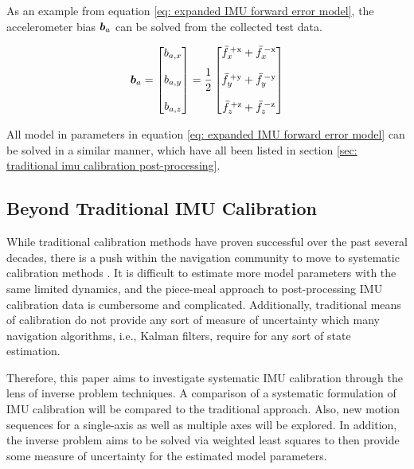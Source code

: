 As an example from equation \ref{eq: expanded IMU forward error model}, the accelerometer bias $\boldsymbol{b}_a$ can be solved from the collected test data.

\begin{align} 
	\boldsymbol{b}_a = \begin{bmatrix} b_{a,x} \\ \\ b_{a,y} \\ \\ b_{a,z} \end{bmatrix} = \frac{1}{2} \begin{bmatrix}
		\bar{f}^{\,+\textrm{x}}_{x} + \bar{f}^{\,-\textrm{x}}_{x} \\
		\\
		\bar{f}^{\,+\textrm{y}}_{y} + \bar{f}^{\,-\textrm{y}}_{y} \\
		\\
		\bar{f}^{\,+\textrm{z}}_{z} + \bar{f}^{\,-\textrm{z}}_{z}
	\end{bmatrix}
\end{align}

All model in parameters in equation \ref{eq: expanded IMU forward error model} can be solved in a similar manner, which have all been listed in section \ref{sec: traditional imu calibration post-processing}.


\subsection{Beyond Traditional IMU Calibration}

While traditional calibration methods have proven successful over the past several decades, there is a push within the navigation community to move to systematic calibration methods \cite{s16060940}. It is difficult to estimate more model parameters with the same limited dynamics, and the piece-meal approach to post-processing IMU calibration data is cumbersome and complicated. Additionally, traditional means of calibration do not provide any sort of measure of uncertainty which many navigation algorithms, i.e., Kalman filters, require for any sort of state estimation.

Therefore, this paper aims to investigate systematic IMU calibration through the lens of inverse problem techniques. A comparison of a systematic formulation of IMU calibration will be compared to the traditional approach. Also, new motion sequences for a single-axis as well as multiple axes will be explored. In addition, the inverse problem aims to be solved via weighted least squares to then provide some measure of uncertainty for the estimated model parameters.

